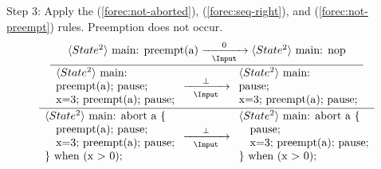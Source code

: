 \noindent
Step 3: Apply the (\ref{forec:not-aborted}), (\ref{forec:seq-right}), 
and (\ref{forec:not-preempt}) rules. Preemption does not occur.
\begin{equation*}
	\frac{
		\dfrac{
				\langle State^2 \rangle ~ \text{main: preempt(a)}
					\xrightarrow[~~\Input~~]{0}
				 \langle State^2 \rangle ~ \text{main: nop}
			}{
				\begin{array}{l}
					\langle State^2 \rangle ~ \text{main:}	\\
					\text{preempt(a); pause;}				\\
					\text{x=3; preempt(a); pause;}							
				\end{array}
					\xrightarrow[~~\Input~~]{\bot} 
				\begin{array}{l}
					\langle State^2 \rangle ~ \text{main:}	\\
					\text{pause;}							\\
					\text{x=3; preempt(a); pause;}							
				\end{array}
			}
		}{
			\begin{array}{l}
				\langle State^2 \rangle ~ \text{main: abort a \{}	\\
				\text{~~~preempt(a); pause;}						\\
				\text{~~~x=3; preempt(a); pause;}					\\
				\text{\} when (x > 0);}
			\end{array}
				\xrightarrow[~~\Input~~]{\bot} 
			\begin{array}{l}
				\langle State^2 \rangle ~ \text{main: abort a \{}	\\
				\text{~~~pause;}									\\
				\text{~~~x=3; preempt(a); pause;}					\\
				\text{\} when (x > 0);}
			\end{array}
		}
\end{equation*}

